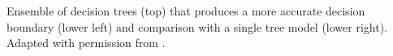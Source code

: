 Ensemble of decision trees (top) that produces a more accurate decision boundary (lower left) and comparison with a single tree model (lower right). Adapted with permission from \cite{Geurts_2009}.
\label{fig:tree_ensemble}
